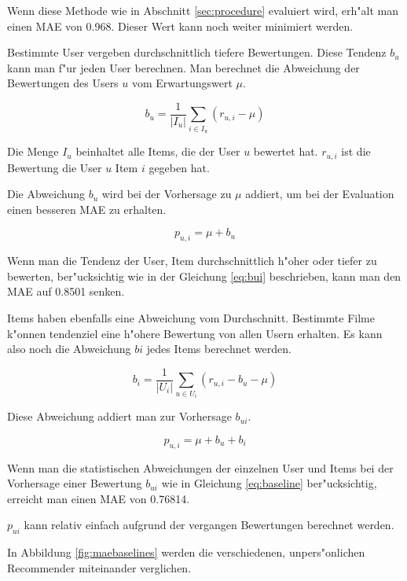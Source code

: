 \documentclass[a4paper, 12pt]{article}
\begin{document}
Wenn diese Methode wie in Abschnitt \ref{sec:procedure} evaluiert wird, erh"alt man einen MAE von 0.968. Dieser Wert kann noch weiter minimiert werden.

Bestimmte User vergeben durchschnittlich tiefere Bewertungen. Diese Tendenz $b_u$ kann man f"ur jeden User berechnen. Man berechnet die Abweichung der Bewertungen des Users $u$ vom Erwartungswert $\mu$.

\begin{equation}
  b_u = \frac{1}{|I_u|}\sum_{i \in I_u}(r_{u,i} - \mu)
\end{equation}

Die Menge $I_u$ beinhaltet alle Items, die der User $u$ bewertet hat. $r_{u,i}$ ist die Bewertung die User $u$ Item $i$ gegeben hat.

Die Abweichung $b_u$ wird bei der Vorhersage zu $\mu$ addiert, um bei der Evaluation einen besseren MAE zu erhalten.

\begin{equation}
  \label{eq:bui}
  p_{u,i} = \mu + b_u
\end{equation}

Wenn man die Tendenz der User, Item durchschnittlich h"oher oder tiefer zu bewerten, ber"ucksichtig wie in der Gleichung \ref{eq:bui} beschrieben, kann man den MAE auf 0.8501 senken. 

Items haben ebenfalls eine Abweichung vom Durchschnitt. Bestimmte Filme k"onnen tendenziel eine h"ohere Bewertung von allen Usern erhalten. Es kann also noch die Abweichung $bi$ jedes Items berechnet werden.

\begin{equation}
  \label{eq:bi}
  b_i = \frac{1}{|U_i|}\sum_{u \in U_i}(r_{u,i} - b_u - \mu)
\end{equation}

Diese Abweichung addiert man zur Vorhersage $b_{ui}$.

\begin{equation}
  \label{eq:baseline}
  p_{u,i} = \mu + b_u + b_i
\end{equation}

Wenn man die statistischen Abweichungen der einzelnen User und Items bei der Vorhersage einer Bewertung $b_{ui}$ wie in Gleichung \ref{eq:baseline} ber"ucksichtig, erreicht man einen MAE von 0.76814.

$p_{ui}$ kann relativ einfach aufgrund der vergangen Bewertungen berechnet werden.

In Abbildung \ref{fig:maebaselines} werden die verschiedenen, unpers"onlichen Recommender miteinander verglichen. 
\end{document}
